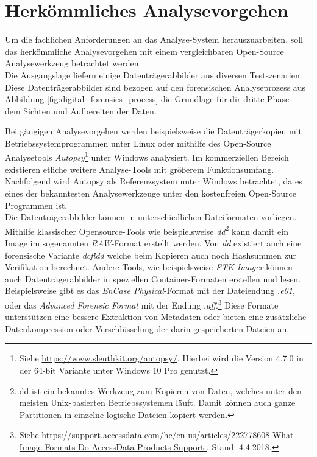 \section{Herkömmliches Analysevorgehen}
\label{sec:common_analysis_approach_part1}
Um die fachlichen Anforderungen an das Analyse-System herauszuarbeiten, soll das herkömmliche Analysevorgehen mit einem vergleichbaren Open-Source Analysewerkzeug betrachtet werden.\\
Die Ausgangslage liefern einige Datenträgerabbilder aus diversen Testszenarien. Diese Datenträgerabbilder sind bezogen auf den forensischen Analyseprozess aus Abbildung \ref{fig:digital_forensics_process} die Grundlage für dir dritte Phase - dem Sichten und Aufbereiten der Daten.

\noindent
Bei gängigen Analysevorgehen werden beispielsweise die Datenträgerkopien mit Betriebssystemprogrammen unter Linux oder mithilfe des Open-Source Analysetools \textit{Autopsy}\footnote{Siehe \url{https://www.sleuthkit.org/autopsy/}. Hierbei wird die Version 4.7.0 in der 64-bit Variante unter Windows 10 Pro genutzt.} unter Windows analysiert. Im kommerziellen Bereich existieren etliche weitere Analyse-Tools mit größerem Funktionsumfang. Nachfolgend wird Autopsy als Referenzsystem unter Windows betrachtet, da es eines der bekanntesten Analysewerkzeuge unter den kostenfreien Open-Source Programmen ist. \\ 

\noindent
Die Datenträgerabbilder können in unterschiedlichen Dateiformaten vorliegen. Mithilfe klassischer Opensource-Tools wie beispielsweise \textit{dd}\footnote{dd ist ein bekanntes Werkzeug zum Kopieren von Daten, welches unter den meisten Unix-basierten Betriebssystemen läuft. Damit können auch ganze Partitionen in einzelne logische Dateien kopiert werden.} kann damit ein Image im sogenannten \textit{RAW}-Format erstellt werden. Von \textit{dd} existiert auch eine forensische Variante \textit{dcfldd} welche beim Kopieren auch noch Hashsummen zur Verifikation berechnet.\cite{linux_forensics}  Andere Tools, wie beispielsweise \textit{FTK-Imager} können auch Datenträgerabbilder in speziellen Container-Formaten erstellen und lesen. Beispielsweise gibt es das \textit{EnCase Physical}-Format mit der Dateiendung \textit{.e01}, oder das \textit{Advanced Forensic Format} mit der Endung \textit{.aff}.\footnote{Siehe \url{https://support.accessdata.com/hc/en-us/articles/222778608-What-Image-Formats-Do-AccessData-Products-Support-}, Stand: 4.4.2018.} Diese Formate unterstützen eine bessere Extraktion von Metadaten oder bieten eine zusätzliche Datenkompression oder Verschlüsselung der darin gespeicherten Dateien an.\cite[S. 35]{digital_forensics}\\

